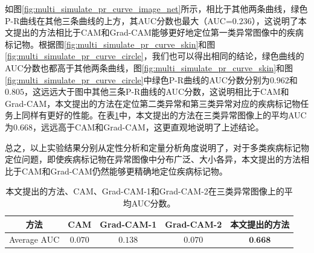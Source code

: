 如图\ref{fig:multi_simulate_pr_curve_image_net}所示，相比于其他两条曲线，绿色P-R曲线在其他三条曲线的上方，其AUC分数也最大（AUC=$0.236$），这说明了本文提出的方法相比于CAM和Grad-CAM能够更好地定位第一类异常图像中的疾病标记物。根据图\ref{fig:multi_simulate_pr_curve_skin}和图\ref{fig:multi_simulate_pr_curve_circle}，我们也可以得出相同的结论，绿色曲线的AUC分数也都高于其他两条曲线，图\ref{fig:multi_simulate_pr_curve_skin}和图\ref{fig:multi_simulate_pr_curve_circle}中绿色P-R曲线的AUC分数分别为$0.962$和$0.805$，这远远大于图中其他三条P-R曲线的AUC分数，这说明相比于CAM和Grad-CAM，本文提出的方法在定位第二类异常和第三类异常对应的疾病标记物任务上同样有更好的性能。在表\ref{tab:multi_ds_auc_scores}中，本文提出的方法在三类异常图像上的平均AUC为$0.668$，远远高于CAM和Grad-CAM，这更直观地说明了上述结论。

总之，以上实验结果分别从定性分析和定量分析角度说明了，对于多类疾病标记物定位问题，即使疾病标记物在异常图像中分布广泛、大小各异，本文提出的方法相比于CAM和Grad-CAM仍然能够更精确地定位疾病标记物。
\begin{table}[!htbp]
	\centering
	\caption[三种疾病标记物定位方法在三类异常图像上的平均AUC分数]{本文提出的方法、CAM、Grad-CAM-1和Grad-CAM-2在三类异常图像上的平均AUC分数。}
	\label{tab:multi_ds_auc_scores}
	\begin{tabular}{c|c|c|c|c}
		\toprule[2pt]
		方法 & CAM & Grad-CAM-1 & Grad-CAM-2 & 本文提出的方法 \\
		\midrule[2pt]
		Average AUC & $0.070$ & $0.138$ & $0.070$ & $\textbf{0.668}$ \\
		\bottomrule[2pt]
	\end{tabular}
\end{table}
\vspace{-0.7cm}
